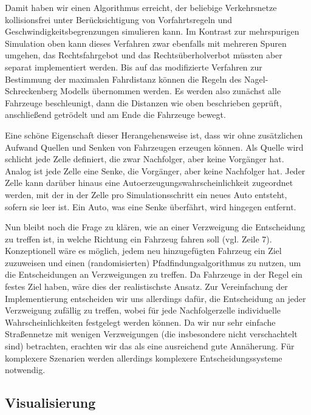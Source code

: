 \documentclass[11pt, a4paper]{article}
\begin{document}


Damit haben wir einen Algorithmus erreicht, der beliebige Verkehrsnetze kollisionsfrei unter Berücksichtigung von Vorfahrtsregeln und Geschwindigkeitsbegrenzungen simulieren kann. Im Kontrast zur mehrspurigen Simulation oben kann dieses Verfahren zwar ebenfalls mit mehreren Spuren umgehen, das Rechtsfahrgebot und das Rechtsüberholverbot müssten aber separat implementiert werden. Bis auf das modifizierte Verfahren zur Bestimmung der maximalen Fahrdistanz können die Regeln des Nagel-Schreckenberg Modells \cite{nagel-schreckenberg} übernommen werden. Es werden also zunächst alle Fahrzeuge beschleunigt, dann die Distanzen wie oben beschrieben geprüft, anschließend getrödelt und am Ende die Fahrzeuge bewegt.

Eine schöne Eigenschaft dieser Herangehensweise ist, dass wir ohne zusätzlichen Aufwand Quellen und Senken von Fahrzeugen erzeugen können. Als Quelle wird schlicht jede Zelle definiert, die zwar Nachfolger, aber keine Vorgänger hat. Analog ist jede Zelle eine Senke, die Vorgänger, aber keine Nachfolger hat. Jeder Zelle kann darüber hinaus eine Autoerzeugungswahrscheinlichkeit zugeordnet werden, mit der in der Zelle pro Simulationsschritt ein neues Auto entsteht, sofern sie leer ist. Ein Auto, was eine Senke überfährt, wird hingegen entfernt.

Nun bleibt noch die Frage zu klären, wie an einer Verzweigung die Entscheidung zu treffen ist, in welche Richtung ein Fahrzeug fahren soll (vgl. Zeile 7). Konzeptionell wäre es möglich, jedem neu hinzugefügten Fahrzeug ein Ziel zuzuweisen und einen (randomisierten) Pfadfindungsalgorithmus zu nutzen, um die Entscheidungen an Verzweigungen zu treffen. Da Fahrzeuge in der Regel ein festes Ziel haben, wäre dies der realistischste Ansatz. Zur Vereinfachung der Implementierung entscheiden wir uns allerdings dafür, die Entscheidung an jeder Verzweigung zufällig zu treffen, wobei für jede Nachfolgerzelle individuelle Wahrscheinlichkeiten festgelegt werden können. Da wir nur sehr einfache Straßennetze mit wenigen Verzweigungen (die insbesondere nicht verschachtelt sind) betrachten, erachten wir das als eine ausreichend gute Annäherung. Für komplexere Szenarien werden allerdings komplexere Entscheidungssysteme notwendig.


\subsection{Visualisierung}
\label{subsec:visualisierung}
\end{document}
